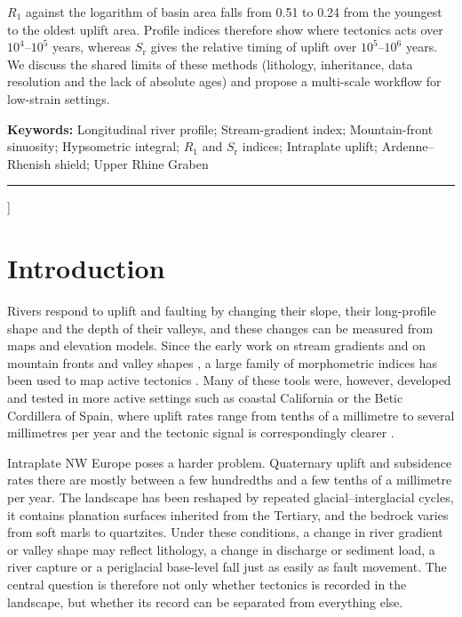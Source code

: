 \documentclass[10pt,a4paper,twocolumn]{article}
\begin{document}
{{$R_1$ against the logarithm of basin area falls from 0.51 to 0.24 from the youngest to the oldest uplift
area. Profile indices therefore show where tectonics acts over $10^4$--$10^5$ years, whereas $S_\mathrm{r}$
gives the relative timing of uplift over $10^5$--$10^6$ years. We discuss the shared limits of these
methods (lithology, inheritance, data resolution and the lack of absolute ages) and propose a
multi-scale workflow for low-strain settings.\par}
\vspace{5pt}
{\small\noindent\textbf{Keywords:} Longitudinal river profile; Stream-gradient index; Mountain-front
sinuosity; Hypsometric integral; $R_1$ and $S_\mathrm{r}$ indices; Intraplate uplift; Ardenne--Rhenish
shield; Upper Rhine Graben\par}
\vspace{5pt}
\noindent\rule{\textwidth}{0.8pt}
\vspace{12pt}
}]

\section{Introduction}

Rivers respond to uplift and faulting by changing their slope, their long-profile shape and the
depth of their valleys, and these changes can be measured from maps and elevation models. Since the
early work on stream gradients \citep{Hack1973} and on mountain fronts and valley shapes
\citep{BullMcFadden1977}, a large family of morphometric indices has been used to map active
tectonics \citep{BurbankAnderson2001,KellerPinter2002,KirbyWhipple2012}. Many of these tools were, however, developed and tested in more active settings such as coastal
California or the Betic Cordillera of Spain, where uplift rates range from tenths of a millimetre to
several millimetres per year and the tectonic signal is correspondingly clearer
\citep{MerrittsVincent1989,Silva2003,ElHamdouni2008}.

Intraplate NW Europe poses a harder problem. Quaternary uplift and subsidence rates there are
mostly between a few hundredths and a few tenths of a millimetre per year. The landscape has been
reshaped by repeated glacial--interglacial cycles, it contains planation surfaces inherited from the
Tertiary, and the bedrock varies from soft marls to quartzites. Under these conditions, a change in
river gradient or valley shape may reflect lithology, a change in discharge or sediment load, a river
capture or a periglacial base-level fall just as easily as fault movement. The central question is
therefore not only whether tectonics is recorded in the landscape, but whether its record can be
separated from everything else.
\end{document}
